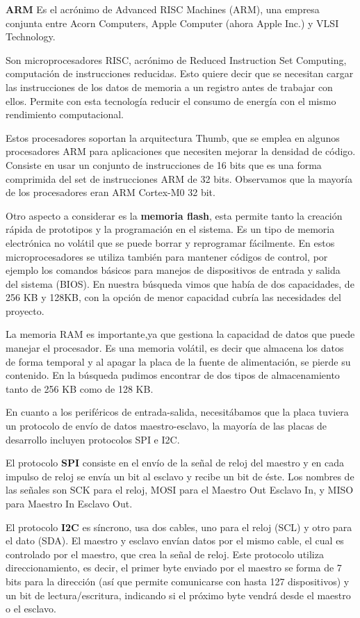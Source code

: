\textbf{ARM} Es el acrónimo de Advanced RISC Machines (ARM), una empresa conjunta entre Acorn Computers, Apple Computer (ahora Apple Inc.) y VLSI Technology.

Son microprocesadores RISC, acrónimo de Reduced Instruction Set Computing, computación de instrucciones reducidas. Esto quiere decir que se necesitan cargar  las instrucciones  de los datos de memoria a un registro antes de trabajar con ellos. Permite con esta tecnología reducir el consumo de energía con el mismo rendimiento computacional.

Estos procesadores soportan la arquitectura Thumb, que se emplea en algunos procesadores ARM para aplicaciones que necesiten mejorar la densidad de código. Consiste en usar un conjunto de instrucciones de 16 bits que es una forma comprimida del set de instrucciones ARM de 32 bits.
Observamos que la mayoría de los procesadores eran ARM Cortex-M0 32 bit.

Otro aspecto a considerar es la \textbf{memoria flash}, esta permite tanto la creación rápida de prototipos y la programación en el sistema. Es un tipo de memoria electrónica no volátil que se puede borrar y reprogramar fácilmente.
En estos microprocesadores se utiliza también para mantener códigos de control, por ejemplo los comandos básicos para manejos de dispositivos de entrada y salida del sistema (BIOS).
En nuestra búsqueda vimos que había de dos capacidades, de 256 KB y 128KB, con la opción de menor capacidad cubría las necesidades del proyecto.

La memoria RAM es importante,ya que gestiona la capacidad de datos que puede manejar el procesador. Es una memoria volátil, es decir que almacena los datos de forma temporal y al apagar la placa de la fuente de alimentación, se pierde su contenido.
En la búsqueda pudimos encontrar de dos tipos de almacenamiento tanto de  256 KB como de 128 KB.

En cuanto a los periféricos de entrada-salida, necesitábamos que la placa tuviera un protocolo de envío de datos maestro-esclavo, la mayoría de las placas de desarrollo incluyen protocolos SPI e I2C.

El protocolo \textbf{SPI} consiste en el envío de la señal de reloj del maestro y en cada impulso de reloj se envía un bit al esclavo y recibe un bit de éste. Los nombres de las señales son SCK para el reloj, MOSI para el Maestro Out Esclavo In, y MISO para Maestro In Esclavo Out.

El protocolo \textbf{I2C} es síncrono, usa dos cables, uno para el reloj (SCL) y otro para el dato (SDA). El maestro y esclavo envían datos por el mismo cable, el cual es controlado por el maestro, que crea la señal de reloj. Este protocolo utiliza direccionamiento, es decir, el primer byte enviado por el maestro se forma de 7 bits para la dirección (así que permite comunicarse con hasta 127 dispositivos) y un bit de lectura/escritura, indicando si el próximo byte vendrá desde el maestro o el esclavo.

